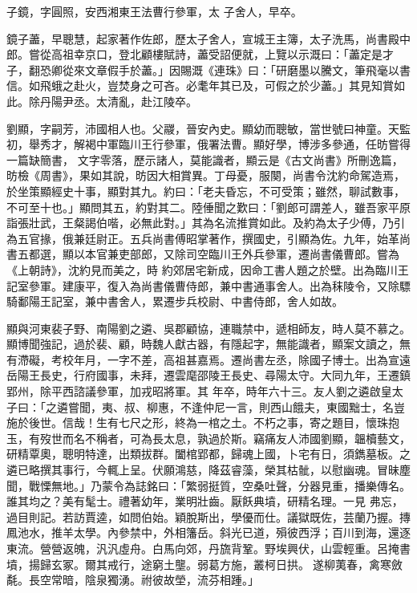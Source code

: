 \begin{pinyinscope}
 子鏡，字圓照，安西湘東王法曹行參軍，太
 子舍人，早卒。



 鏡子藎，早聰慧，起家著作佐郎，歷太子舍人，宣城王主簿，太子洗馬，尚書殿中郎。嘗從高祖幸京口，登北顧樓賦詩，藎受詔便就，上覽以示溉曰：「藎定是才子，翻恐卿從來文章假手於藎。」因賜溉《連珠》曰：「研磨墨以騰文，筆飛毫以書信。如飛蛾之赴火，豈焚身之可吝。必耄年其已及，可假之於少藎。」其見知賞如此。除丹陽尹丞。太清亂，赴江陵卒。



 劉顯，字嗣芳，沛國相人也。父鬷，晉安內史。顯幼而聰敏，當世號曰神童。天監初，舉秀才，解褐中軍臨川王行參軍，俄署法曹。顯好學，博涉多參通，任昉嘗得一篇缺簡書，
 文字零落，歷示諸人，莫能識者，顯云是《古文尚書》所刪逸篇，昉檢《周書》，果如其說，昉因大相賞異。丁母憂，服闋，尚書令沈約命駕造焉，於坐策顯經史十事，顯對其九。約曰：「老夫昏忘，不可受策；雖然，聊試數事，不可至十也。」顯問其五，約對其二。陸倕聞之歎曰：「劉郎可謂差人，雖吾家平原詣張壯武，王粲謁伯喈，必無此對。」其為名流推賞如此。及約為太子少傅，乃引為五官掾，俄兼廷尉正。五兵尚書傅昭掌著作，撰國史，引顯為佐。九年，始革尚書五都選，顯以本官兼吏部郎，又除司空臨川王外兵參軍，遷尚書儀曹郎。嘗為《上朝詩》，沈約見而美之，時
 約郊居宅新成，因命工書人題之於壁。出為臨川王記室參軍。建康平，復入為尚書儀曹侍郎，兼中書通事舍人。出為秣陵令，又除驃騎鄱陽王記室，兼中書舍人，累遷步兵校尉、中書侍郎，舍人如故。



 顯與河東裴子野、南陽劉之遴、吳郡顧協，連職禁中，遞相師友，時人莫不慕之。顯博聞強記，過於裴、顧，時魏人獻古器，有隱起字，無能識者，顯案文讀之，無有滯礙，考校年月，一字不差，高祖甚嘉焉。遷尚書左丞，除國子博士。出為宣遠岳陽王長史，行府國事，未拜，遷雲麾邵陵王長史、尋陽太守。大同九年，王遷鎮郢州，除平西諮議參軍，加戎昭將軍。其
 年卒，時年六十三。友人劉之遴啟皇太子曰：「之遴嘗聞，夷、叔、柳惠，不逢仲尼一言，則西山餓夫，東國黜士，名豈施於後世。信哉！生有七尺之形，終為一棺之土。不朽之事，寄之題目，懷珠抱玉，有歿世而名不稱者，可為長太息，孰過於斯。竊痛友人沛國劉顯，韞櫝藝文，研精覃奧，聰明特達，出類拔群。闔棺郢都，歸魂上國，卜宅有日，須鐫墓板。之遴已略撰其事行，今輒上呈。伏願鴻慈，降茲睿藻，榮其枯骴，以慰幽魂。冒昧塵聞，戰慄無地。」乃蒙令為誌銘曰：「繁弱挺質，空桑吐聲，分器見重，播樂傳名。誰其均之？美有髦士。禮著幼年，業明壯齒。厭飫典墳，研精名理。一見
 弗忘，過目則記。若訪賈逵，如問伯始。穎脫斯出，學優而仕。議獄既佐，芸蘭乃握。摶鳳池水，推羊太學。內參禁中，外相籓岳。斜光已道，殞彼西浮；百川到海，還逐東流。營營返魄，汎汎虛舟。白馬向郊，丹旒背鞏。野埃興伏，山雲輕重。呂掩書墳，揚歸玄冢。爾其戒行，途窮土壟。弱葛方施，叢柯日拱。遂柳荑春，禽寒斂氄。長空常暗，陰泉獨湧。祔彼故塋，流芬相踵。」




\end{pinyinscope}

